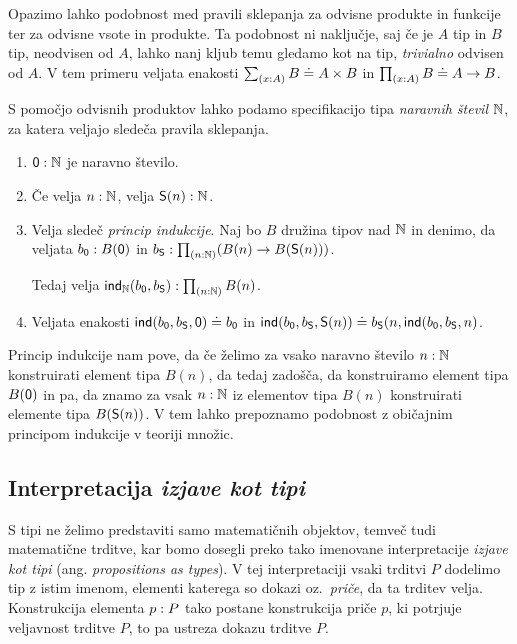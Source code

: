 \begin{opomba}
  \label{neodvisna-vsota}
Opazimo lahko podobnost med pravili sklepanja za odvisne produkte in
funkcije ter za odvisne vsote in produkte. Ta podobnost ni naključje, saj če
je \(A\) tip in \(B\) tip, neodvisen od \(A\), lahko nanj kljub temu gledamo kot na tip,
\emph{trivialno} odvisen od \(A\). V tem primeru veljata enakosti
\(\textstyle \sum_{\left( x : A \right)} B \doteq A \times B\) in \(\textstyle \prod_{\left( x : A \right)} B \doteq A \to B\).
\end{opomba}

\begin{primer}
  S pomočjo odvisnih produktov lahko podamo specifikacijo tipa
  \emph{naravnih števil} \(\mathbb N\), za katera veljajo sledeča pravila sklepanja.
  \begin{enumerate}
  \item \(\textnormal{\textsf{0}} : \mathbb N\) je naravno število.
  \item Če velja \(n : \mathbb N\),
    velja \(\textnormal{\textsf{S}}(n) : \mathbb N\).
  \item Velja sledeč \emph{princip indukcije}. Naj bo \(B\) družina tipov nad \(\mathbb N\) in
    denimo, da veljata \(b_{\textnormal{\textsf{0}}} : B(\textnormal{\textsf{0}})\) in
    \(b_{\textnormal{\textsf{S}}} : \textstyle \prod_{\left( n : \mathbb N \right)} (B(n) \to B(\textnormal{\textsf{S}}(n)))\).

    Tedaj velja
    \(\textnormal{\textsf{ind}}_{\mathbb N}(b_{\textnormal{\textsf{0}}}, b_{\textnormal{\textsf{S}}}) : \textstyle \prod_{\left( n : \mathbb N \right)} B(n)\).
  \item Veljata enakosti
    \label{naturals}
    \(\textnormal{\textsf{ind}}(b_{\textnormal{\textsf{0}}}, b_{\textnormal{\textsf{S}}}, \textnormal{\textsf{0}}) \doteq b_{\textnormal{\textsf{0}}}\) in
    \(\textnormal{\textsf{ind}}(b_{\textnormal{\textsf{0}}}, b_{\textnormal{\textsf{S}}}, \textnormal{\textsf{S}}(n)) \doteq
      b_{\textnormal{\textsf{S}}}(n, \textnormal{\textsf{ind}}(b_{\textnormal{\textsf{0}}}, b_{\textnormal{\textsf{S}}}, n)\).
  \end{enumerate}
  Princip indukcije nam pove, da če želimo za vsako naravno število \(n : \mathbb N\)
  konstruirati element tipa \(B(n)\), da tedaj zadošča, da konstruiramo element tipa \(B(\textnormal{\textsf{0}})\) in pa, da znamo za vsak \(n : \mathbb N\) iz elementov tipa \(B(n)\) konstruirati elemente tipa \(B(\textnormal{\textsf{S}}(n))\). V tem lahko prepoznamo podobnost z običajnim principom indukcije v teoriji množic.
\end{primer}

\subsection{Interpretacija \emph{izjave kot tipi}}

S tipi ne želimo predstaviti samo matematičnih objektov, temveč tudi matematične trditve,
kar bomo dosegli preko tako imenovane interpretacije \emph{izjave kot tipi}
(ang. \emph{propositions as types}). V tej interpretaciji vsaki trditvi \(P\) dodelimo
tip z istim imenom, elementi katerega so dokazi oz.~\emph{priče}, da ta trditev velja.
Konstrukcija
elementa \(p : P\) tako postane konstrukcija priče \(p\), ki potrjuje
veljavnost trditve \(P\), to pa ustreza dokazu trditve \(P\).

